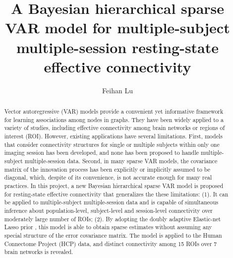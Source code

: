 \documentclass[12pt]{elsarticle}
\begin{document}
	
	\begin{frontmatter}
		
		\title{A Bayesian hierarchical sparse VAR model for multiple-subject multiple-session resting-state effective connectivity}
		
		\author{Feihan Lu}
		
		
		\begin{abstract}
			Vector autoregressive (VAR) models provide a convenient yet informative framework for learning associations among nodes in graphs. 
			They have been widely applied to a variety of studies, including effective connectivity among brain networks or regions of interest (ROI).  
			However, existing applications have several limitations. 
			First, models that consider connectivity structures for single or multiple subjects within only one imaging session has been developed, and none has been proposed to handle multiple-subject multiple-session data.
			Second, in many sparse VAR models, the covariance matrix of the innovation process has been explicitly or implicitly assumed to be diagonal, which, despite of its convenience, is not accurate enough for many real practices.   
			In this project, a new Bayesian hierarchical sparse VAR model is proposed for resting-state effective connectivity that generalizes the these limitations:
			(1). It can be applied to multiple-subject multiple-session data and is capable of simultaneous inference about population-level, subject-level and session-level connectivity over moderately large number of ROIs; 
			(2). By adopting the doubly adaptive Elastic-net Lasso prior \cite{Gefang}, this model is able to obtain sparse estimates without assuming any special structure of the error covariance matrix. 
			The model is applied to the Human Connectome Project (HCP) data, and  distinct connectivity among 15 ROIs over 7 brain networks is revealed.
		\end{abstract}
		
		
	\end{frontmatter}
	
	
	
	
	
\end{document}
